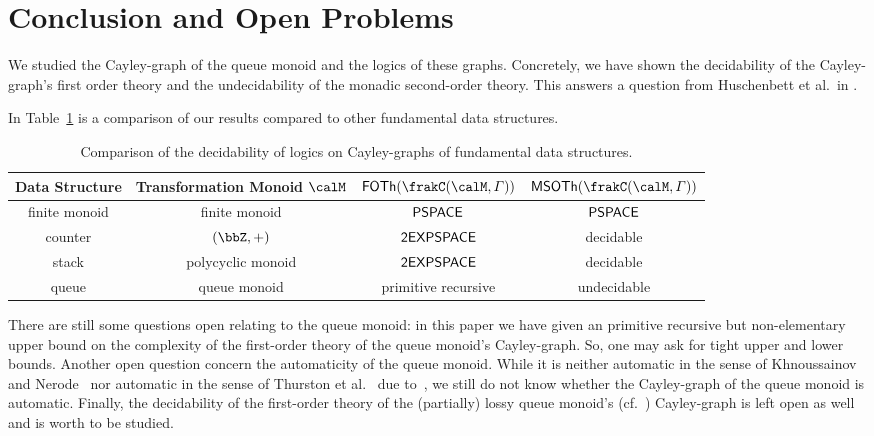 \section{Conclusion and Open Problems}
We studied the Cayley-graph of the queue monoid and the logics of these graphs. Concretely, we have shown the decidability of the Cayley-graph's first order theory and the undecidability of the monadic second-order theory. This answers a question from Huschenbett et al.\ in \cite{HusKZ17}.

In Table~\ref{tab:conclusion} is a comparison of our results compared to other fundamental data structures.

\begin{table}[h]
	\begin{tabular}{cc|cc}
		Data Structure & Transformation Monoid $\calM$ & $\FOTh{\cayley{\calM}{\varGamma}}$ & $\MSOTh{\cayley{\calM}{\varGamma}}$\\
		\hline
		\hline
		finite monoid & finite monoid & $\mathsf{PSPACE}$ \cite{Graedel03} & $\mathsf{PSPACE}$ \cite{Graedel03}\\
		counter & $(\bbZ,+)$ & $\mathsf{2EXPSPACE}$ \cite{KusL11} & decidable \cite{KusL06}\\
		stack & polycyclic monoid & $\mathsf{2EXPSPACE}$ \cite{KusL11} & decidable \cite{DelKT03,KusL06}\\
		queue & queue monoid & primitive recursive & undecidable
	\end{tabular}
	\caption{Comparison of the decidability of logics on Cayley-graphs of fundamental data structures.\label{tab:conclusion}}
\end{table}

There are still some questions open relating to the queue monoid: in this paper we have given an primitive recursive but non-elementary upper bound on the complexity of the first-order theory of the queue monoid's Cayley-graph. So, one may ask for tight upper and lower bounds.
Another open question concern the automaticity of the queue monoid. While it is neither automatic in the sense of Khnoussainov and Nerode~\cite{KN95} nor automatic in the sense of Thurston et al.~\cite{CEHLPT92} due to~\cite{HusKZ17}, we still do not know whether the Cayley-graph of the queue monoid is automatic.
Finally, the decidability of the first-order theory of the (partially) lossy queue monoid's (cf.~\cite{KKP18,Koe18}) Cayley-graph is left open as well and is worth to be studied.